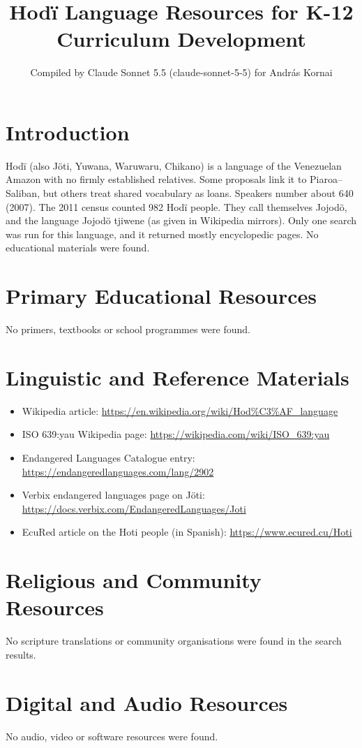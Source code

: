 \documentclass[12pt]{article}
\title{Hod\"i Language Resources for K-12 Curriculum Development}
\author{Compiled by Claude Sonnet 5.5 (claude-sonnet-5-5) for Andr\'as Kornai}
\date{}
\begin{document}
\maketitle

\section{Introduction}
Hod\"i (also J\"oti, Yuwana, Waruwaru, Chikano) is a language of the Venezuelan Amazon with no firmly established relatives. Some proposals link it to Piaroa--Saliban, but others treat shared vocabulary as loans. Speakers number about 640 (2007). The 2011 census counted 982 Hod\"i people. They call themselves Jojod\"o, and the language Jojod\"o tjiwene (as given in Wikipedia mirrors). Only one search was run for this language, and it returned mostly encyclopedic pages. No educational materials were found.

\section{Primary Educational Resources}
No primers, textbooks or school programmes were found.

\section{Linguistic and Reference Materials}
\begin{itemize}
\item Wikipedia article: \url{https://en.wikipedia.org/wiki/Hod%C3%AF_language}
\item ISO 639:yau Wikipedia page: \url{https://wikipedia.com/wiki/ISO_639:yau}
\item Endangered Languages Catalogue entry: \url{https://endangeredlanguages.com/lang/2902}
\item Verbix endangered languages page on J\"oti: \url{https://docs.verbix.com/EndangeredLanguages/Joti}
\item EcuRed article on the Hoti people (in Spanish): \url{https://www.ecured.cu/Hoti}
\end{itemize}

\section{Religious and Community Resources}
No scripture translations or community organisations were found in the search results.

\section{Digital and Audio Resources}
No audio, video or software resources were found.
\end{document}
